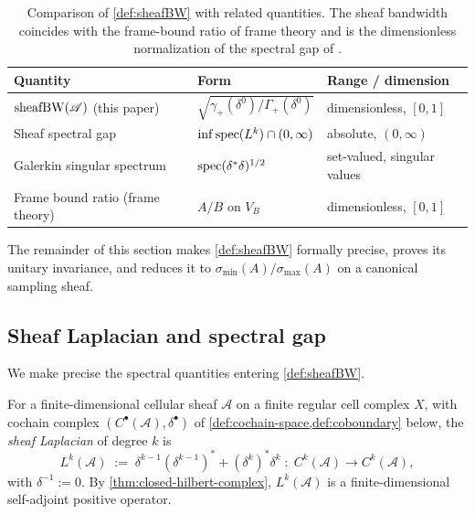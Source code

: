 \begin{table}[h]
  \centering
  \small
  \begin{tabular}{@{}lll@{}}
    \toprule
    Quantity & Form & Range / dimension \\
    \midrule
    $\operatorname{sheafBW}(\mathscr{A})$ (this paper) &
       $\sqrt{\gamma_+(\delta^0)/\Gamma_+(\delta^0)}$ &
       dimensionless, $[0, 1]$ \\
    Sheaf spectral gap \cite{HansenGhrist2019} &
       $\inf \operatorname{spec}(L^k) \cap (0, \infty)$ &
       absolute, $(0, \infty)$ \\
    Galerkin singular spectrum \cite{LahtinenStenvall2020} &
       $\operatorname{spec}(\delta^* \delta)^{1/2}$ &
       set-valued, singular values \\
    Frame bound ratio (frame theory) &
       $A/B$ on $V_B$ &
       dimensionless, $[0, 1]$ \\
    \bottomrule
  \end{tabular}
  \caption{Comparison of \cref{def:sheafBW} with related
    quantities. The sheaf bandwidth coincides with the frame-bound
    ratio of frame theory and is the dimensionless normalization of
    the spectral gap of \cite{HansenGhrist2019}.}\label{tab:sheafbw-comparison}
\end{table}

The remainder of this section makes \cref{def:sheafBW} formally
precise, proves its unitary invariance, and reduces it to
$\sigma_{\min}(A)/\sigma_{\max}(A)$ on a canonical sampling sheaf.

\subsection{Sheaf Laplacian and spectral gap}\label{subsec:sheafbw-spectral-gap}

We make precise the spectral quantities entering \cref{def:sheafBW}.

\begin{definition}\label{def:sheaf-laplacian}
For a finite-dimensional cellular sheaf $\mathscr{A}$ on a finite
regular cell complex $X$, with cochain complex
$(C^\bullet(\mathscr{A}), \delta^\bullet)$ of
\cref{def:cochain-space,def:coboundary} below, the \emph{sheaf
Laplacian} of degree $k$ is
\[
  L^k(\mathscr{A}) \;:=\; \delta^{k-1} (\delta^{k-1})^*
  + (\delta^k)^* \delta^k
  \;:\;
  C^k(\mathscr{A}) \longrightarrow C^k(\mathscr{A}),
\]
with $\delta^{-1} := 0$. By \cref{thm:closed-hilbert-complex},
$L^k(\mathscr{A})$ is a finite-dimensional self-adjoint positive
operator.
\end{definition}

